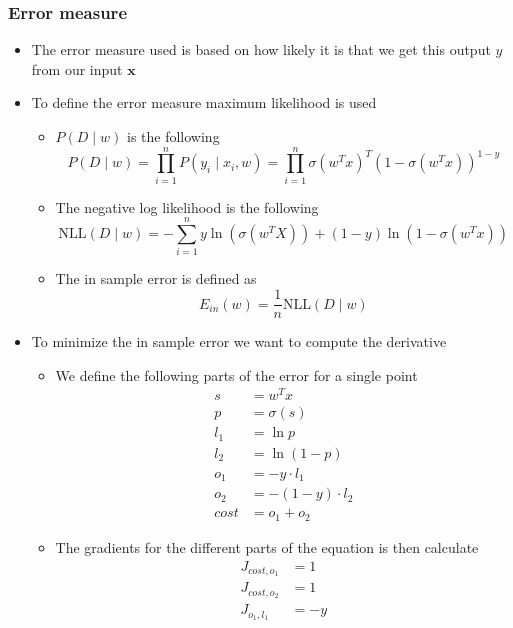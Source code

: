 \documentclass[a4, english]{article}
\begin{document}
\subsubsection{Error measure}
\begin{itemize}
	\item The error measure used is based on how likely it is that we get this output $y$ from our input $\pmb x$ 
  \item To define the error measure maximum likelihood is used 
  \begin{itemize}
    \item $P(D \mid w)$ is the following
\begin{equation*}
  P(D \mid w) = \prod_{i=1}^nP(y_i \mid x_i,w) = \prod_{i=1}^n \sigma(w^Tx)^T(1-\sigma(w^Tx))^{1-y}
\end{equation*}
    \item The negative log likelihood is the following
\begin{equation*}
  \text{NLL}(D \mid w) = - \sum_{i=1}^n y\ln(\sigma(w^TX)) + (1-y)\ln(1- \sigma(w^Tx))
\end{equation*}
    \item The in sample error is defined as 
\begin{equation*}
  E_{in}(w) = \frac1n \text{NLL}(D \mid w)
\end{equation*}
    \end{itemize}
  \item To minimize the in sample error we want to compute the derivative 
  \begin{itemize}
  	\item We define the following parts of the error for a single point
\begin{align*}
  s &= w^Tx \\
  p &= \sigma (s) \\
  l_1 &= \ln p \\
  l_2 &= \ln (1-p) \\
  o_1 &= -y \cdot l_1  \\
  o_2 &= -(1-y) \cdot l_2 \\
  cost &=  o_1 + o_2 
\end{align*}
  \newpage %
    \item The gradients for the different parts of the equation is then calculate
\begin{align*}
   J_{cost,o_1} &= 1 \\ 
   J_{cost,o_2} &= 1 \\
  J_{o_1, l_1} &= -y \\

\end{align*}
\end{itemize}
\end{itemize}
\end{document}
